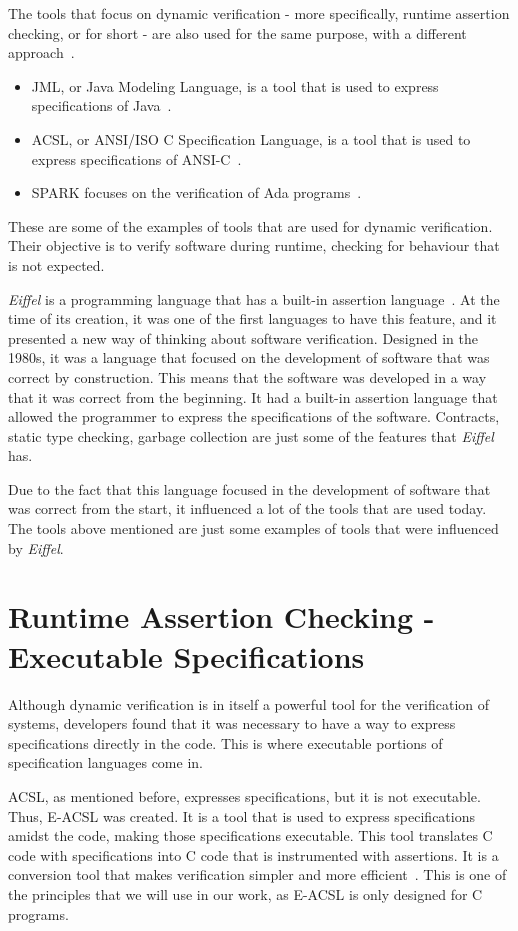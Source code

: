The tools that focus on dynamic verification - more specifically, runtime assertion checking, 
or \rac for short - are also used for the same purpose, with a different approach~\cite{Maurica2018}.
\begin{itemize}
  \item JML, or Java Modeling Language, is a tool that is used to express specifications of Java~\cite{Leavens2008}.
  \item ACSL, or ANSI/ISO C Specification Language, is a tool that is used to express specifications of ANSI-C~\cite{Baudin}.
  \item SPARK focuses on the verification of Ada programs~\cite{Spark2022}.
\end{itemize}
These are some of the examples of tools that are used for dynamic verification. Their objective 
is to verify software during runtime, checking for behaviour that is not expected.

\textit{Eiffel} is a programming language that has a built-in assertion language~\cite{Maurica2018}. 
At the time of its creation, it was one of the first languages to have this feature, and it presented 
a new way of thinking about software verification. Designed in the 1980s, it was a language that 
focused on the development of software that was correct by construction. This means that the 
software was developed in a way that it was correct from the beginning. It had a built-in assertion 
language that allowed the programmer to express the specifications of the software. Contracts, 
static type checking, garbage collection are just some of the features that \textit{Eiffel} has. 

Due to the fact that this language focused in the development of software that was correct from the 
start, it influenced a lot of the tools that are used today. The tools above mentioned are 
just some examples of tools that were influenced by \textit{Eiffel}.

\section{Runtime Assertion Checking - Executable Specifications}
\label{sec:runtime_assertion_checking_executable_specifications}


Although dynamic verification is in itself a powerful tool for the verification of systems, 
developers found that it was necessary to have a way to express specifications directly in the 
code. This is where executable portions of specification languages come in. 

ACSL, as mentioned before, expresses specifications, but it is not executable. Thus, 
E-ACSL was created. It is a tool that is used to express specifications 
amidst the code, making those specifications executable. This tool translates C code with 
specifications into C code that is instrumented with assertions. It is a conversion tool 
that makes verification simpler and more efficient~\cite{Maurica2018}. This is one of the 
principles that we will use in our work, as E-ACSL is only designed for C programs.